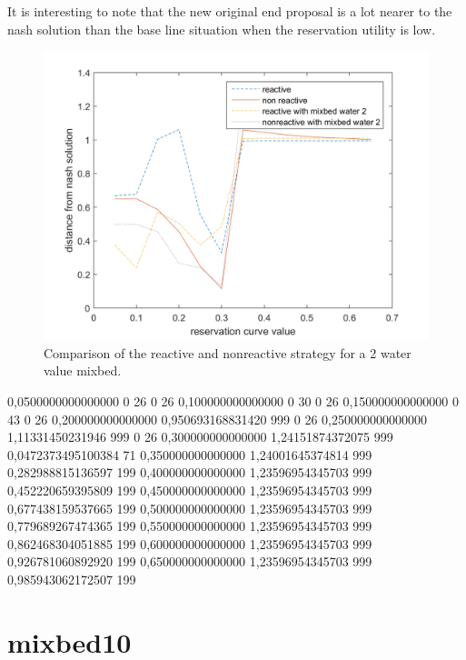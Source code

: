 It is interesting to note that the new original end proposal is a lot nearer to the nash solution than the base line situation when the reservation utility is low.
\begin{figure}
	\centering
	\includegraphics[width=0.7\linewidth]{img/reactivevsnonreactivemixbed2.png}
	\caption{Comparison of the reactive and nonreactive strategy for a 2 water value mixbed.}
	\label{fig:reactivevsnonreactivemixbed2}
\end{figure}


0,0500000000000000	0	26	0	26
0,100000000000000	0	30	0	26
0,150000000000000	0	43	0	26
0,200000000000000	0,950693168831420	999	0	26
0,250000000000000	1,11331450231946	999	0	26
0,300000000000000	1,24151874372075	999	0,0472373495100384	71
0,350000000000000	1,24001645374814	999	0,282988815136597	199
0,400000000000000	1,23596954345703	999	0,452220659395809	199
0,450000000000000	1,23596954345703	999	0,677438159537665	199
0,500000000000000	1,23596954345703	999	0,779689267474365	199
0,550000000000000	1,23596954345703	999	0,862468304051885	199
0,600000000000000	1,23596954345703	999	0,926781060892920	199
0,650000000000000	1,23596954345703	999	0,985943062172507	199



\section{mixbed10}









